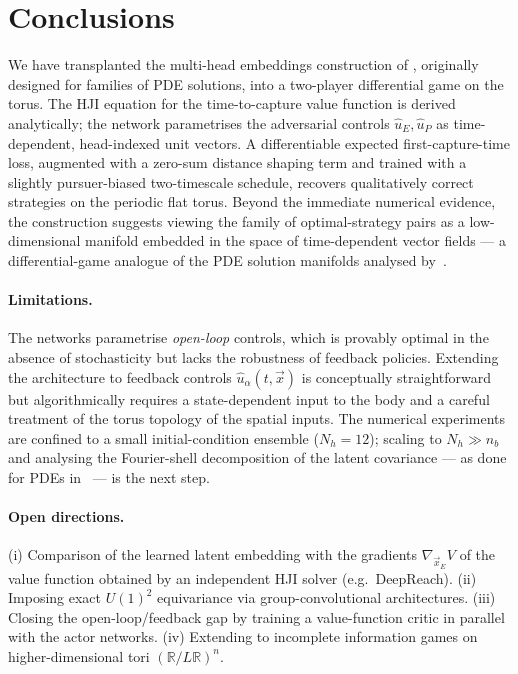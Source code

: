 \documentclass[11pt]{article}
\newcommand{\xE}{\vec{x}_E}
\newcommand{\RR}{\mathbb{R}}
\begin{document}
\section{Conclusions}
We have transplanted the multi-head embeddings construction of
\citep{JimenezEmbeddings2026}, originally designed for families of
PDE solutions, into a two-player differential game on the torus.
The HJI equation for the time-to-capture value function is derived
analytically; the network parametrises the adversarial controls
$\hat u_E,\hat u_P$ as time-dependent, head-indexed unit vectors.
A differentiable expected first-capture-time loss, augmented with a
zero-sum distance shaping term and trained with a slightly
pursuer-biased two-timescale schedule, recovers qualitatively
correct strategies on the periodic flat torus.  Beyond the immediate
numerical evidence, the construction suggests viewing the family of
optimal-strategy pairs as a low-dimensional manifold embedded in the
space of time-dependent vector fields --- a differential-game analogue
of the PDE solution manifolds analysed by~\citep{JimenezEmbeddings2026}.

\paragraph{Limitations.}
The networks parametrise \emph{open-loop} controls, which is provably
optimal in the absence of stochasticity but lacks the robustness of
feedback policies.  Extending the architecture to feedback controls
$\hat u_\alpha(t,\vec x)$ is conceptually straightforward but
algorithmically requires a state-dependent input to the body and a
careful treatment of the torus topology of the spatial inputs.  The
numerical experiments are confined to a small initial-condition
ensemble ($N_h=12$); scaling to $N_h\gg n_b$ and analysing the
Fourier-shell decomposition of the latent covariance --- as done for
PDEs in~\citep{JimenezEmbeddings2026} --- is the next step.

\paragraph{Open directions.}
(i) Comparison of the learned latent embedding with the gradients
$\nabla_{\xE}V$ of the value function obtained by an independent HJI
solver (e.g.\ DeepReach).
(ii) Imposing exact $U(1)^2$ equivariance via group-convolutional
architectures.
(iii) Closing the open-loop/feedback gap by training a value-function
critic in parallel with the actor networks.
(iv) Extending to incomplete information games on higher-dimensional tori $(\RR/L\RR)^n$.
\end{document}
